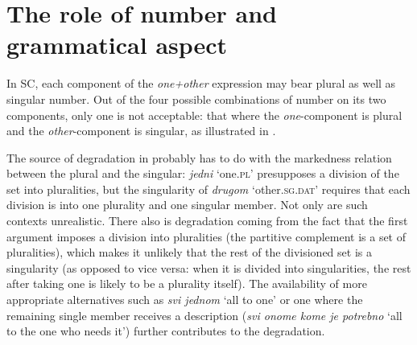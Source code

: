 \documentclass[output=paper,colorlinks,citecolor=brown]{langscibook}
\begin{document}
\section{The role of number and grammatical aspect}\label{sec:6}

In SC, each component of the \textit{one+other} expression may bear plural as well as singular number. Out of the four possible combinations of number on its two components, only one is not acceptable: that where the \textit{one}-component is plural and the \textit{other}-component is singular, as illustrated in .

\ea\label{Susedi3} 
\label{Susedi3-a}

\label{Susedi3-b} 

\label{Susedi3-c} 

 \label{Susedi3-d} 
\z \z 

\noindent The source of degradation in  probably has to do with the markedness relation between the plural and the singular: \textit{jedni} `one.\textsc{pl}' presupposes a division of the set into pluralities, but the singularity of \textit{drugom} `other.\textsc{sg.dat}' requires that each division is into one plurality and one singular member. Not only are such contexts unrealistic. There also is degradation coming from the fact that the first argument imposes a division into pluralities (the partitive complement is a set of pluralities), which makes it unlikely that the rest of the divisioned set is a singularity (as opposed to vice versa: when it is divided into singularities, the rest after taking one is likely to be a plurality itself). The availability of more appropriate alternatives such as \textit{svi jednom} `all to one' or one where the remaining single member receives a description (\textit{svi onome kome je potrebno} `all to the one who needs it') further contributes to the degradation.
\end{document}
